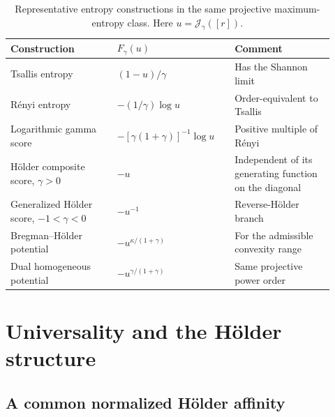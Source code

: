 \documentclass[pdflatex,sn-mathphys-num]{sn-jnl}
\theoremstyle{thmstyleone}
\theoremstyle{thmstyletwo}
\theoremstyle{thmstylethree}
\newcommand{\calJ}{\mathcal{J}}
\begin{document}
\begin{table}[t]
\centering
\small
\caption{Representative entropy constructions in the same projective maximum-entropy class. Here $u=\calJ_\gamma([r])$.}
\label{tab:entropy-class}
\begin{tabular}{>{\raggedright\arraybackslash}p{0.30\linewidth}p{0.33\linewidth}p{0.29\linewidth}}
\toprule
Construction & $F_\gamma(u)$ & Comment \\
\midrule
Tsallis entropy \citep{Tsallis1988}
& $(1-u)/\gamma$
& Has the Shannon limit \\
R\'enyi entropy \citep{Renyi1961}
& $-(1/\gamma)\log u$
& Order-equivalent to Tsallis \\
Logarithmic gamma score \citep{FujisawaEguchi2008}
& $-[\gamma(1+\gamma)]^{-1}\log u$
& Positive multiple of R\'enyi \\
H\"older composite score, $\gamma>0$ \citep{KanamoriFujisawa2014Bernoulli}
& $-u$
& Independent of its generating function on the diagonal \\
Generalized H\"older score, $-1<\gamma<0$ \citep{Kanamori2014Entropy}
& $-u^{-1}$
& Reverse-H\"older branch \\
Bregman--H\"older potential \citep{KanamoriFujisawa2014Bernoulli,Kanamori2014Entropy}
& $-u^{\kappa/(1+\gamma)}$
& For the admissible convexity range \\
Dual homogeneous potential \citep{HinoEguchi2023}
& $-u^{\gamma/(1+\gamma)}$
& Same projective power order \\
\bottomrule
\end{tabular}
\end{table}


\section{Universality and the H\"older structure}\label{sec:universality}

\subsection{A common normalized H\"older affinity}
\end{document}
